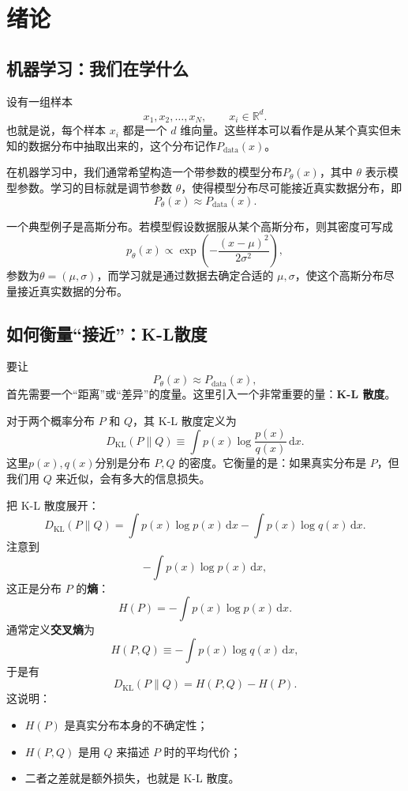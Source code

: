 \newpage
\section{绪论}
\subsection{机器学习：我们在学什么}

设有一组样本
\[
x_1,x_2,\dots,x_N,\qquad x_i\in\mathbb{R}^d.
\]
也就是说，每个样本 \(x_i\) 都是一个 \(d\) 维向量。这些样本可以看作是从某个真实但未知的数据分布中抽取出来的，这个分布记作\(P_{\mathrm{data}}(x)\)。

在机器学习中，我们通常希望构造一个带参数的模型分布\(P_\theta(x)\)，其中 \(\theta\) 表示模型参数。学习的目标就是调节参数 \(\theta\)，使得模型分布尽可能接近真实数据分布，即
\[
P_\theta(x)\approx P_{\mathrm{data}}(x).
\]

一个典型例子是高斯分布。若模型假设数据服从某个高斯分布，则其密度可写成
\[
p_\theta(x)\propto \exp\left(-\frac{(x-\mu)^2}{2\sigma^2}\right),
\]
参数为\(\theta=(\mu,\sigma)\)，而学习就是通过数据去确定合适的 \(\mu,\sigma\)，使这个高斯分布尽量接近真实数据的分布。

\subsection{如何衡量``接近''：K-L散度}

要让
\[
P_\theta(x)\approx P_{\mathrm{data}}(x),
\]
首先需要一个``距离''或``差异''的度量。这里引入一个非常重要的量：\textbf{K-L 散度}。

对于两个概率分布 \(P\) 和 \(Q\)，其 K-L 散度定义为
\[
D_{\mathrm{KL}}(P\|Q)\equiv\int p(x)\log\frac{p(x)}{q(x)}\,\mathrm{d}x.
\]
这里\(p(x),q(x)\)分别是分布 \(P,Q\) 的密度。它衡量的是：如果真实分布是 \(P\)，但我们用 \(Q\) 来近似，会有多大的信息损失。

把 K-L 散度展开：
\[
D_{\mathrm{KL}}(P\|Q)
=
\int p(x)\log p(x)\,\mathrm{d}x
-
\int p(x)\log q(x)\,\mathrm{d}x.
\]
注意到
\[
-\int p(x)\log p(x)\,\mathrm{d}x,
\]
这正是分布 \(P\) 的\textbf{熵}：
\[
H(P)=-\int p(x)\log p(x)\,\mathrm{d}x.
\]
通常定义\textbf{交叉熵}为
\[
H(P,Q)\equiv-\int p(x)\log q(x)\,\mathrm{d}x,
\]
于是有
\[
D_{\mathrm{KL}}(P\|Q)=H(P,Q)-H(P).
\]
这说明：
\begin{itemize}[leftmargin=2.5em]
    \item \(H(P)\) 是真实分布本身的不确定性；
    \item \(H(P,Q)\) 是用 \(Q\) 来描述 \(P\) 时的平均代价；
    \item 二者之差就是额外损失，也就是 K-L 散度。
\end{itemize}

